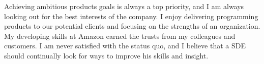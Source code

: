 



Achieving ambitious products goals is always a top priority, and I am always looking out for the best interests of the company. I enjoy delivering programming products to our potential clients and focusing on the strengths of an organization. My developing skills at Amazon earned the trusts from my colleagues and customers. I am never satisfied with the status quo, and I believe that a SDE should continually look for ways to improve his skills and insight.